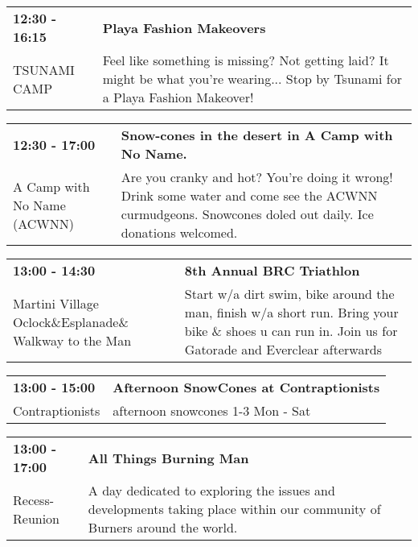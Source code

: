 \begin{tabular}{ p{1in} p{2.2in} }
    \textbf{12:30 - 16:15} & \textbf{Playa Fashion Makeovers} \\
    TSUNAMI CAMP \newline  & Feel like something is missing?  Not getting laid?  It might be what you're wearing...  Stop by Tsunami for a Playa Fashion Makeover! \\
    \hline 
\end{tabular}
    
\begin{tabular}{ p{1in} p{2.2in} }
    \textbf{12:30 - 17:00} & \textbf{Snow-cones in the desert in A Camp with No Name.} \\
    A Camp with No Name (ACWNN) \newline  & Are you cranky and hot? You're doing it wrong! Drink some water and come see the ACWNN curmudgeons. Snowcones doled out daily. Ice donations welcomed. \\
    \hline 
\end{tabular}
    
\begin{tabular}{ p{1in} p{2.2in} }
    \textbf{13:00 - 14:30} & \textbf{8th Annual BRC Triathlon} \\
    Martini Village \newline 6 Oclock\&Esplanade\& Walkway to the Man  & Start w/a dirt swim, bike around the man, finish w/a short run. Bring your bike \& shoes u can run in. Join us for Gatorade and Everclear afterwards \\
    \hline 
\end{tabular}
    
\begin{tabular}{ p{1in} p{2.2in} }
    \textbf{13:00 - 15:00} & \textbf{Afternoon SnowCones at Contraptionists} \\
    Contraptionists \newline  & afternoon snowcones 1-3 Mon - Sat \\
    \hline 
\end{tabular}
    
\begin{tabular}{ p{1in} p{2.2in} }
    \textbf{13:00 - 17:00} & \textbf{All Things Burning Man} \\
    Recess-Reunion \newline  & A day dedicated to exploring the issues and developments taking place within our community of Burners around the world. \\
    \hline 
\end{tabular}
    
